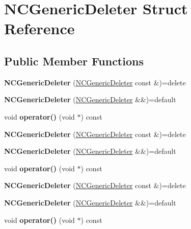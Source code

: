 \hypertarget{struct_n_c_generic_deleter}{}\section{N\+C\+Generic\+Deleter Struct Reference}
\label{struct_n_c_generic_deleter}
\subsection*{Public Member Functions}
\begin{DoxyCompactItemize}
\item 
\mbox{\label{struct_n_c_generic_deleter_af896ca0ac6d22c14c347d70b8344f756}} 
{\bfseries N\+C\+Generic\+Deleter} (\mbox{\hyperlink{struct_n_c_generic_deleter}{N\+C\+Generic\+Deleter}} const \&)=delete
\item 
\mbox{\label{struct_n_c_generic_deleter_a72c878e0a40e9cabe6e6c83dbdc9a07a}} 
{\bfseries N\+C\+Generic\+Deleter} (\mbox{\hyperlink{struct_n_c_generic_deleter}{N\+C\+Generic\+Deleter}} \&\&)=default
\item 
\mbox{\label{struct_n_c_generic_deleter_a904528efdb0e2507aeae1262f668174d}} 
void {\bfseries operator()} (void $\ast$) const
\item 
\mbox{\label{struct_n_c_generic_deleter_af896ca0ac6d22c14c347d70b8344f756}} 
{\bfseries N\+C\+Generic\+Deleter} (\mbox{\hyperlink{struct_n_c_generic_deleter}{N\+C\+Generic\+Deleter}} const \&)=delete
\item 
\mbox{\label{struct_n_c_generic_deleter_a72c878e0a40e9cabe6e6c83dbdc9a07a}} 
{\bfseries N\+C\+Generic\+Deleter} (\mbox{\hyperlink{struct_n_c_generic_deleter}{N\+C\+Generic\+Deleter}} \&\&)=default
\item 
\mbox{\label{struct_n_c_generic_deleter_a904528efdb0e2507aeae1262f668174d}} 
void {\bfseries operator()} (void $\ast$) const
\item 
\mbox{\label{struct_n_c_generic_deleter_af896ca0ac6d22c14c347d70b8344f756}} 
{\bfseries N\+C\+Generic\+Deleter} (\mbox{\hyperlink{struct_n_c_generic_deleter}{N\+C\+Generic\+Deleter}} const \&)=delete
\item 
\mbox{\label{struct_n_c_generic_deleter_a72c878e0a40e9cabe6e6c83dbdc9a07a}} 
{\bfseries N\+C\+Generic\+Deleter} (\mbox{\hyperlink{struct_n_c_generic_deleter}{N\+C\+Generic\+Deleter}} \&\&)=default
\item 
\mbox{\label{struct_n_c_generic_deleter_a904528efdb0e2507aeae1262f668174d}} 
void {\bfseries operator()} (void $\ast$) const
\end{DoxyCompactItemize}


